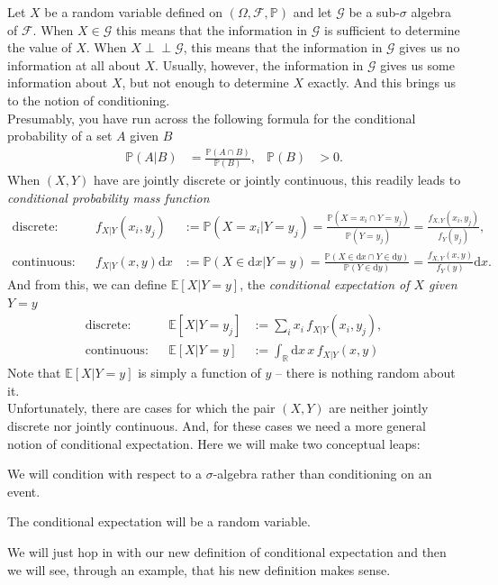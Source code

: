 \documentclass[12pt]{book}
\numberwithin{equation}{chapter}
\theoremstyle{plain}
\numberwithin{theorem}{section}
\theoremstyle{definition}
\numberwithin{exercise}{chapter}
\newcommand{\<}{\langle}
\renewcommand{\>}{\rangle}
\renewcommand{\(}{\left(}
\renewcommand{\)}{\right)}
\renewcommand{\[}{\left[}
\renewcommand{\]}{\right]}
\newcommand\Eb{\mathds{E}}
\newcommand\Pb{\mathds{P}}
\newcommand\Rb{\mathds{R}}
\newcommand\Fc{\mathscr{F}}
\newcommand\Gc{\mathscr{G}}
\newcommand\Om{\Omega}
\newcommand\sig{\sigma}
\newcommand{\ind}{\perp \! \! \! \perp}
\newcommand\dd{\mathrm{d}}
\begin{document}
Let $X$ be a random variable defined on $(\Om,\Fc,\Pb)$ and let $\Gc$ be a sub-$\sig$ algebra of $\Fc$.
When $X \in \Gc$ this means that the information in $\Gc$ is sufficient to determine the value of $X$.
When $X \ind \Gc$, this means that the information in $\Gc$ gives us no information at all about $X$.
Usually, however, the information in $\Gc$ gives us some information about $X$, but not enough to determine $X$ exactly.  And this brings us to the notion of conditioning.
\\[0.5em]
Presumably, you have run across the following formula for the conditional probability of a set $A$ given $B$
\begin{align}
\Pb( A | B )
	&=	\frac{ \Pb( A \cap B ) }{ \Pb( B ) } , &
\Pb(B)
	&> 	0 .
\end{align}
When $(X,Y)$ have are jointly discrete or jointly continuous, this readily leads to \emph{conditional probability mass function}
\begin{align}
\text{discrete}:&&
f_{X|Y}(x_i,y_j)
	&:=	\Pb( X = x_i | Y = y_j )
	=		\frac{ \Pb( X = x_i \cap Y = y_j ) }{ \Pb( Y = y_j ) }
	=		\frac{ f_{X,Y}(x_i,y_j)}{f_Y(y_j)} , \\
\text{continuous}:&&
f_{X|Y}(x,y) \dd x 
	&:=	\Pb( X \in \dd x | Y = y )
	=		\frac{ \Pb( X \in \dd x \cap Y \in \dd y ) }{ \Pb( Y \in \dd y ) }
	=		\frac{ f_{X,Y}(x,y)}{f_Y(y)} \dd x .
\end{align}
And from this, we can define $\Eb[ X | Y = y ]$, the \emph{conditional expectation of $X$ given $Y = y$}
\begin{align}
\text{discrete}:&&
\Eb[ X | Y = y_j ]
	&:=	\sum_i x_i \, f_{X|Y}(x_i,y_j) , \\
\text{continuous}:&&
\Eb[ X | Y = y ]
	&:=	\int_\Rb \dd x \, x \, f_{X|Y}(x,y)
\end{align}
Note that $\Eb[ X | Y = y ]$ is simply a function of $y$ -- there is nothing random about it.
\\[0.5em]
Unfortunately, there are cases for which the pair $(X,Y)$ are neither jointly discrete nor jointly continuous.  And, for these cases we need a more general notion of conditional expectation.  Here we will make two conceptual leaps:
\begin{enumerate*}
\item We will condition with respect to a $\sig$-algebra rather than conditioning on an event.
\item The conditional expectation will be a random variable.
\end{enumerate*}
We will just hop in with our new definition of conditional expectation and then we will see, through an example, that his new definition makes sense.
\end{document}
